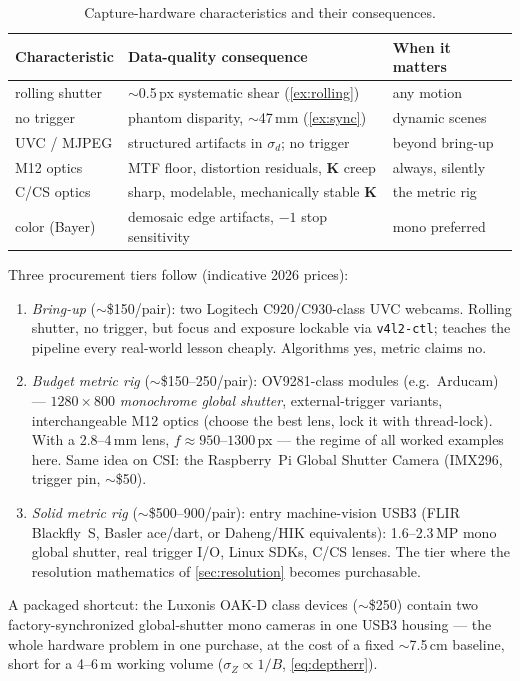 \documentclass[11pt]{article}
\theoremstyle{definition}
\newcommand{\mat}[1]{\mathbf{#1}}
\newcommand{\K}{\mat{K}}
\newcommand{\code}[1]{\texttt{#1}}
\begin{document}
\begin{table}[ht]
\centering
\begin{tabular}{lll}
\toprule
Characteristic & Data-quality consequence & When it matters \\
\midrule
rolling shutter & $\sim$0.5\,px systematic shear (\autoref{ex:rolling}) & any motion \\
no trigger      & phantom disparity, $\sim$47\,mm (\autoref{ex:sync})   & dynamic scenes \\
UVC / MJPEG     & structured artifacts in $\sigma_d$; no trigger        & beyond bring-up \\
M12 optics      & MTF floor, distortion residuals, $\K$ creep           & always, silently \\
C/CS optics     & sharp, modelable, mechanically stable $\K$            & the metric rig \\
color (Bayer)   & demosaic edge artifacts, $-1$ stop sensitivity        & mono preferred \\
\bottomrule
\end{tabular}
\caption{Capture-hardware characteristics and their consequences.}
\label{tab:hardware}
\end{table}

Three procurement tiers follow (indicative 2026 prices):
\begin{enumerate}
  \item \emph{Bring-up} ($\sim$\$150/pair): two Logitech C920/C930-class
        UVC webcams. Rolling shutter, no trigger, but focus and exposure
        lockable via \code{v4l2-ctl}; teaches the pipeline every
        real-world lesson cheaply. Algorithms yes, metric claims no.
  \item \emph{Budget metric rig} ($\sim$\$150--250/pair): OV9281-class
        modules (e.g.\ Arducam) --- $1280\times800$ \emph{monochrome
        global shutter}, external-trigger variants, interchangeable M12
        optics (choose the best lens, lock it with thread-lock). With a
        2.8--4\,mm lens, $f\approx950$--$1300$\,px --- the regime of all
        worked examples here. Same idea on CSI: the Raspberry~Pi Global
        Shutter Camera (IMX296, trigger pin, $\sim$\$50).
  \item \emph{Solid metric rig} ($\sim$\$500--900/pair): entry
        machine-vision USB3 (FLIR Blackfly~S, Basler ace/dart, or
        Daheng/HIK equivalents): 1.6--2.3\,MP mono global shutter, real
        trigger I/O, Linux SDKs, C/CS lenses. The tier where the
        resolution mathematics of \autoref{sec:resolution} becomes
        purchasable.
\end{enumerate}
A packaged shortcut: the Luxonis OAK-D class devices ($\sim$\$250)
contain two factory-synchronized global-shutter mono cameras in one USB3
housing --- the whole hardware problem in one purchase, at the cost of a
fixed $\sim$7.5\,cm baseline, short for a 4--6\,m working volume
($\sigma_Z\propto1/B$, \eqref{eq:deptherr}).
\end{document}
